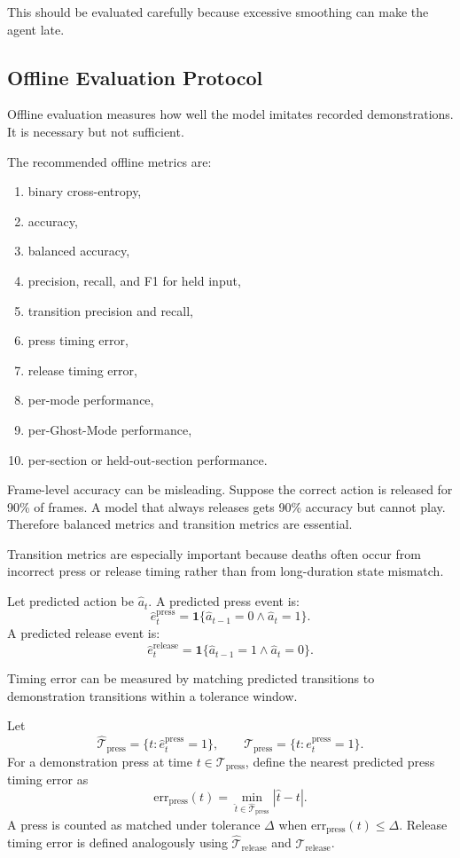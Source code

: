 \documentclass[11pt]{article}
\newcommand{\indicator}[1]{\mathbf{1}\{#1\}}
\begin{document}
This should be evaluated carefully because excessive smoothing can make the agent late.

\subsection{Offline Evaluation Protocol}

Offline evaluation measures how well the model imitates recorded demonstrations. It is necessary but not sufficient.

The recommended offline metrics are:
\begin{enumerate}
  \item binary cross-entropy,
  \item accuracy,
  \item balanced accuracy,
  \item precision, recall, and F1 for held input,
  \item transition precision and recall,
  \item press timing error,
  \item release timing error,
  \item per-mode performance,
  \item per-Ghost-Mode performance,
  \item per-section or held-out-section performance.
\end{enumerate}

Frame-level accuracy can be misleading. Suppose the correct action is released for 90\% of frames. A model that always releases gets 90\% accuracy but cannot play. Therefore balanced metrics and transition metrics are essential.

Transition metrics are especially important because deaths often occur from incorrect press or release timing rather than from long-duration state mismatch.

Let predicted action be \(\hat{a}_t\). A predicted press event is:
\[
  \hat{e}_t^{\mathrm{press}}
  =
  \indicator{\hat{a}_{t-1}=0 \wedge \hat{a}_t=1}.
\]
A predicted release event is:
\[
  \hat{e}_t^{\mathrm{release}}
  =
  \indicator{\hat{a}_{t-1}=1 \wedge \hat{a}_t=0}.
\]

Timing error can be measured by matching predicted transitions to demonstration transitions within a tolerance window.

Let
\[
  \widehat{\mathcal{T}}_{\mathrm{press}}
  =
  \{t : \hat{e}^{\mathrm{press}}_t = 1\},
  \qquad
  \mathcal{T}_{\mathrm{press}}
  =
  \{t : e^{\mathrm{press}}_t = 1\}.
\]
For a demonstration press at time \(t \in \mathcal{T}_{\mathrm{press}}\), define the nearest predicted press timing error as
\[
  \mathrm{err}_{\mathrm{press}}(t)
  =
  \min_{\hat{t}\in \widehat{\mathcal{T}}_{\mathrm{press}}}
  |\hat{t}-t|.
\]
A press is counted as matched under tolerance \(\Delta\) when \(\mathrm{err}_{\mathrm{press}}(t)\le \Delta\). Release timing error is defined analogously using \(\widehat{\mathcal{T}}_{\mathrm{release}}\) and \(\mathcal{T}_{\mathrm{release}}\).
\end{document}
